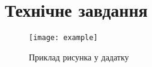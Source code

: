\section{Технічне завдання}%

\begin{figure}[h]
  \centering
  \texttt{[image: example]}
  \caption{\label{img:layout}Приклад рисунка у дадатку}
\end{figure}

